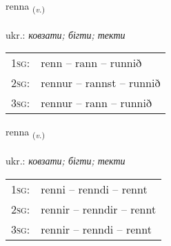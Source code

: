 \documentclass[frontgrid, backgrid]{flacards}\usepackage[]{graphicx}\usepackage[]{xcolor}
\begin{document}
\renewcommand{\flhead}{\vskip5pt \fboxsep=0pt {\small\bfseries\footnotesize Sagnorð | дієслово}}
\renewcommand{\fcfoot}{\vskip5pt \fboxsep=0pt \hspace{2pt}{\small\bfseries\footnotesize 1K}}

\renewcommand{\blhead}{\vskip5pt {\small\bfseries\footnotesize Sagnorð | дієслово }}
\renewcommand{\bcfoot}{\vskip5pt \hspace{2pt}{\small\bfseries\footnotesize 1K}}


{renna \small{\textsubscript{(\textit{v.})}} \\[1ex] %
\textphonetic{[rɛna]} \\
ukr.: \emph{ковзати; бігти; текти} \\  [2ex]
\renewcommand*{\arraystretch}{0.8}
\begin{tabular}{p{1cm}l}
\textsc{1sg}: & renn -- rann -- runnið \\ 
\textsc{2sg}: & rennur -- rannst -- runnið \\ 
\textsc{3sg}: & rennur -- rann -- runnið \\ 
\end{tabular}
}

\renewcommand{\flhead}{\vskip5pt \fboxsep=0pt {\small\bfseries\footnotesize Sagnorð | дієслово}}
\renewcommand{\fcfoot}{\vskip5pt \fboxsep=0pt \hspace{2pt}{\small\bfseries\footnotesize 1K}}

\renewcommand{\blhead}{\vskip5pt {\small\bfseries\footnotesize Sagnorð | дієслово }}
\renewcommand{\bcfoot}{\vskip5pt \hspace{2pt}{\small\bfseries\footnotesize 1K}}


{renna \small{\textsubscript{(\textit{v.})}} \\[1ex] %
\textphonetic{[rɛna]} \\
ukr.: \emph{ковзати; бігти; текти} \\  [2ex]
\renewcommand*{\arraystretch}{0.8}
\begin{tabular}{p{1cm}l}
\textsc{1sg}: & renni -- renndi -- rennt \\ 
\textsc{2sg}: & rennir -- renndir -- rennt \\ 
\textsc{3sg}: & rennir -- renndi -- rennt \\ 
\end{tabular}
}
\end{document}

